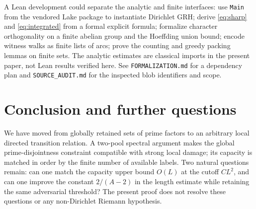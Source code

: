 \documentclass[11pt]{article}
\theoremstyle{remark}\newtheorem{remark}[theorem]{Remark}
\begin{document}
A Lean development could separate the analytic and finite interfaces: use \texttt{Main} from the vendored Lake package to instantiate Dirichlet GRH; derive \eqref{eq:sharp} and \eqref{eq:integrated} from a formal explicit formula; formalize character orthogonality on a finite abelian group and the Hoeffding union bound; encode witness walks as finite lists of arcs; prove the counting and greedy packing lemmas on finite sets. The analytic estimates are classical imports in the present paper, not Lean results verified here. See \texttt{FORMALIZATION.md} for a dependency plan and \texttt{SOURCE\_AUDIT.md} for the inspected blob identifiers and scope.

\section{Conclusion and further questions}
We have moved from globally retained sets of prime factors to an arbitrary local directed transition relation. A two-pool spectral argument makes the global prime-disjointness constraint compatible with strong local damage; its capacity is matched in order by the finite number of available labels. Two natural questions remain: can one match the capacity upper bound $O(L)$ at the cutoff $CL^2$, and can one improve the constant $2/(A-2)$ in the length estimate while retaining the same adversarial threshold? The present proof does not resolve these questions or any non-Dirichlet Riemann hypothesis.
\end{document}
